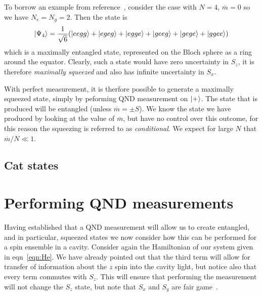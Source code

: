\documentclass{article}
\newcommand*\meas[1]{\overline{#1}}
\begin{document}
To borrow an example from
reference~\cite{Cox2016}, consider the case with $N=4$, $\meas{m}=0$ so we have
$N_e = N_g = 2$. Then the state is
%
\begin{equation}
  \ket{\Psi_4} = \frac{1}{\sqrt{6}}(\ket{eegg} + \ket{egeg} + \ket{egge} +
  \ket{geeg} + \ket{gege} + \ket{ggee})
\end{equation}
%
which is a maximally entangled state, represented on the Bloch sphere as a ring
around the equator.
%
Clearly, such a state would have zero uncertainty in $S_z$, it is therefore
\emph{maximally squeezed}
and also has infinite uncertainty in $S_x$.

With perfect measurement, it is therfore possible to generate a maximally
squeezed state, simply by peforming QND measurement on  $\ket{+}$. The state
that is produced will be entangled (unless $\meas{m} = \pm S$). We know the
state we have produced by looking at the value of $\meas{m}$, but have no
control over this outcome, for this reason the squeezing is referred to as
\emph{conditional}.
%
We expect for large $N$ that $\meas{m}/N \ll 1$.


\subsection{Cat states}


\section{Performing QND measurements}

Having established that a QND measurement will allow us to create entangled,
and in particular, squeezed states we now consider how this can be performed
for a spin ensemble in a cavity. Consider again the Hamiltonian of our system
given in eqn~\ref{eqn:He}. We have already pointed out that the
third term will allow for transfer of information about the $z$ spin into the
cavity light, but notice also that every term commutes with $S_z$. This will
ensure that performing the measurement will not change the $S_z$ state, but
note that $S_x$ and $S_y$ are fair game~\cite{SchleierSmith2011}.
\end{document}

